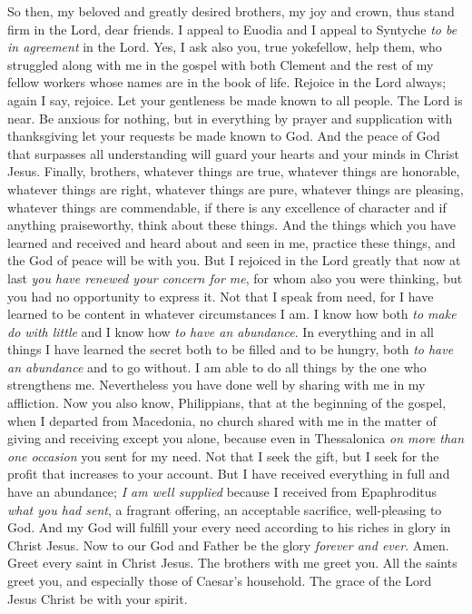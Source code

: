 \begin{biblechapter} %
 So then, my beloved and greatly desired brothers, my joy and crown, thus stand firm in the Lord, dear friends.
\verse I appeal to Euodia and I appeal to Syntyche \textit{to be in agreement} in the Lord.
\verse Yes, I ask also you, true yokefellow, help them, who struggled along with me in the gospel with both Clement and the rest of my fellow workers whose names are in the book of life.
 Rejoice in the Lord always; again I say, rejoice.
\verse Let your gentleness be made known to all people. The Lord is near.
\verse Be anxious for nothing, but in everything by prayer and supplication with thanksgiving let your requests be made known to God.
\verse And the peace of God that surpasses all understanding will guard your hearts and your minds in Christ Jesus.
\verse Finally, brothers, whatever things are true, whatever things are honorable, whatever things are right, whatever things are pure, whatever things are pleasing, whatever things are commendable, if there is any excellence of character and if anything praiseworthy, think about these things.
\verse And the things which you have learned and received and heard about and seen in me, practice these things, and the God of peace will be with you.
 But I rejoiced in the Lord greatly that now at last \textit{you have renewed your concern for me}, for whom also you were thinking, but you had no opportunity to express it.
\verse Not that I speak from need, for I have learned to be content in whatever circumstances I am.
\verse I know how both \textit{to make do with little} and I know how \textit{to have an abundance}. In everything and in all things I have learned the secret both to be filled and to be hungry, both \textit{to have an abundance} and to go without.
\verse I am able to do all things by the one who strengthens me.
\verse Nevertheless you have done well by sharing with me in my affliction.
\verse Now you also know, Philippians, that at the beginning of the gospel, when I departed from Macedonia, no church shared with me in the matter of giving and receiving except you alone,
\verse because even in Thessalonica \textit{on more than one occasion} you sent for my need.
\verse Not that I seek the gift, but I seek for the profit that increases to your account.
\verse But I have received everything in full and have an abundance; \textit{I am well supplied} because I received from Epaphroditus \textit{what you had sent}, a fragrant offering, an acceptable sacrifice, well-pleasing to God.
\verse And my God will fulfill your every need according to his riches in glory in Christ Jesus.
\verse Now to our God and Father be the glory \textit{forever and ever}. Amen.
 Greet every saint in Christ Jesus. The brothers with me greet you.
\verse All the saints greet you, and especially those of Caesar’s household.
\verse The grace of the Lord Jesus Christ be with your spirit.
\end{biblechapter}


